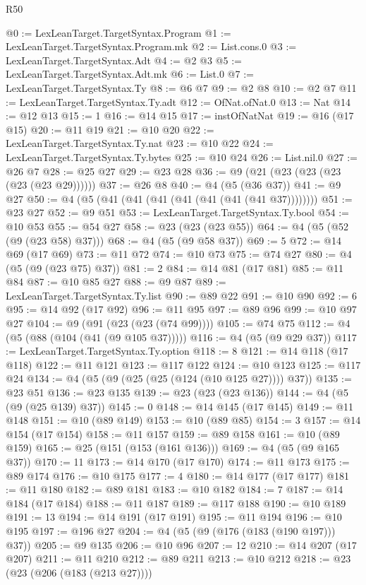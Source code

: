 \begin{lexlean}{R50}
\begin{coremodule}
@0 := LexLeanTarget.TargetSyntax.Program
@1 := LexLeanTarget.TargetSyntax.Program.mk
@2 := List.cons.{0}
@3 := LexLeanTarget.TargetSyntax.Adt
@4 := @2 @3
@5 := LexLeanTarget.TargetSyntax.Adt.mk
@6 := List.{0}
@7 := LexLeanTarget.TargetSyntax.Ty
@8 := @6 @7
@9 := @2 @8
@10 := @2 @7
@11 := LexLeanTarget.TargetSyntax.Ty.adt
@12 := OfNat.ofNat.{0}
@13 := Nat
@14 := @12 @13
@15 := 1
@16 := @14 @15
@17 := instOfNatNat
@19 := @16 (@17 @15)
@20 := @11 @19
@21 := @10 @20
@22 := LexLeanTarget.TargetSyntax.Ty.nat
@23 := @10 @22
@24 := LexLeanTarget.TargetSyntax.Ty.bytes
@25 := @10 @24
@26 := List.nil.{0}
@27 := @26 @7
@28 := @25 @27
@29 := @23 @28
@36 := @9 (@21 (@23 (@23 (@23 (@23 (@23 @29))))))
@37 := @26 @8
@40 := @4 (@5 (@36 @37))
@41 := @9 @27
@50 := @4 (@5 (@41 (@41 (@41 (@41 (@41 (@41 (@41 @37))))))))
@51 := @23 @27
@52 := @9 @51
@53 := LexLeanTarget.TargetSyntax.Ty.bool
@54 := @10 @53
@55 := @54 @27
@58 := @23 (@23 (@23 @55))
@64 := @4 (@5 (@52 (@9 (@23 @58) @37)))
@68 := @4 (@5 (@9 @58 @37))
@69 := 5
@72 := @14 @69 (@17 @69)
@73 := @11 @72
@74 := @10 @73
@75 := @74 @27
@80 := @4 (@5 (@9 (@23 @75) @37))
@81 := 2
@84 := @14 @81 (@17 @81)
@85 := @11 @84
@87 := @10 @85 @27
@88 := @9 @87
@89 := LexLeanTarget.TargetSyntax.Ty.list
@90 := @89 @22
@91 := @10 @90
@92 := 6
@95 := @14 @92 (@17 @92)
@96 := @11 @95
@97 := @89 @96
@99 := @10 @97 @27
@104 := @9 (@91 (@23 (@23 (@74 @99))))
@105 := @74 @75
@112 := @4 (@5 (@88 (@104 (@41 (@9 @105 @37)))))
@116 := @4 (@5 (@9 @29 @37))
@117 := LexLeanTarget.TargetSyntax.Ty.option
@118 := 8
@121 := @14 @118 (@17 @118)
@122 := @11 @121
@123 := @117 @122
@124 := @10 @123
@125 := @117 @24
@134 := @4 (@5 (@9 (@25 (@25 (@124 (@10 @125 @27)))) @37))
@135 := @23 @51
@136 := @23 @135
@139 := @23 (@23 (@23 @136))
@144 := @4 (@5 (@9 (@25 @139) @37))
@145 := 0
@148 := @14 @145 (@17 @145)
@149 := @11 @148
@151 := @10 (@89 @149)
@153 := @10 (@89 @85)
@154 := 3
@157 := @14 @154 (@17 @154)
@158 := @11 @157
@159 := @89 @158
@161 := @10 (@89 @159)
@165 := @25 (@151 (@153 (@161 @136)))
@169 := @4 (@5 (@9 @165 @37))
@170 := 11
@173 := @14 @170 (@17 @170)
@174 := @11 @173
@175 := @89 @174
@176 := @10 @175
@177 := 4
@180 := @14 @177 (@17 @177)
@181 := @11 @180
@182 := @89 @181
@183 := @10 @182
@184 := 7
@187 := @14 @184 (@17 @184)
@188 := @11 @187
@189 := @117 @188
@190 := @10 @189
@191 := 13
@194 := @14 @191 (@17 @191)
@195 := @11 @194
@196 := @10 @195
@197 := @196 @27
@204 := @4 (@5 (@9 (@176 (@183 (@190 @197))) @37))
@205 := @9 @135
@206 := @10 @96
@207 := 12
@210 := @14 @207 (@17 @207)
@211 := @11 @210
@212 := @89 @211
@213 := @10 @212
@218 := @23 (@23 (@206 (@183 (@213 @27))))

\end{coremodule}
\end{lexlean}
